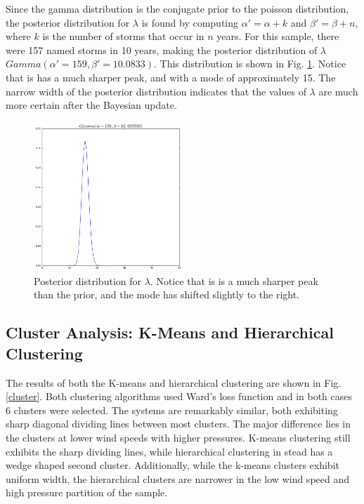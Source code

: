 \documentclass{article}
\begin{document}
	Since the gamma distribution is the conjugate prior to the poisson distribution, the posterior distribution for $\lambda$ is found by computing $\alpha' = \alpha + k$ and $\beta' = \beta + n$, where $k$ is the number of storms that occur in $n$ years. For this sample, there were 157 named storms in 10 years, making the posterior distribution of $\lambda$ $Gamma(\alpha' = 159, \beta' = 10.0833)$. This distribution is shown in Fig. \ref{posterior}. Notice that is has a much sharper peak, and with a mode of approximately 15. The narrow width of the posterior distribution indicates that the values of $\lambda$ are much more certain after the Bayesian update.
	
	\begin{figure}[H]
			\centering
			\includegraphics[width=0.50\textwidth]{images/posterior.png}
		\caption{Posterior distribution for $\lambda$. Notice that is is a much sharper peak than the prior, and the mode has shifted slightly to the right.}
		\label{posterior}
	\end{figure}


	\subsection{Cluster Analysis: K-Means and Hierarchical Clustering}
		The results of both the K-means and hierarchical clustering are shown in Fig. \ref{cluster}. Both clustering algorithms used Ward's loss function and in both cases 6 clusters were selected. The systems are remarkably similar, both exhibiting sharp diagonal dividing lines between most clusters. The major difference lies in the clusters at lower wind speeds with higher pressures.  K-means clustering still exhibits the sharp dividing lines, while hierarchical clustering in stead has a wedge shaped second cluster. Additionally, while the k-means clusters exhibit uniform width, the hierarchical clusters are narrower in the low wind speed and high pressure partition of the sample.
		
\end{document}
